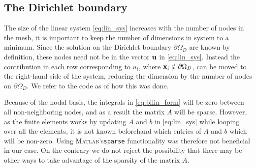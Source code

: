 \subsection{The Dirichlet boundary}
 The size of the linear system \eqref{eq:lin_sys} increases with the number of nodes in the mesh, it is important to keep the number of dimensions in system to a minimum. Since the solution on the Dirichlet boundary $\partial\Omega_D$ are known by definition, these nodes need not be in the vector $\vb{u}$ in \eqref{eq:lin_sys}. Instead the contribution in each row corresponding to $u_i$, where $\vb{x}_i \notin \partial\Omega_D$, can be moved to the right-hand side of the system, reducing the dimension by the number of nodes on $\partial\Omega_D$. We refer to the code as of how this was done.

 Because of the nodal basis, the integrals in \eqref{eq:bilin_form} will be zero between all non-neighboring nodes, and as a result the matrix $A$ will be sparse. However, as the finite elements works by updating $A$ and $b$ in \eqref{eq:lin_sys} while looping over all the elements, it is not known beforehand which entries of $A$ and $b$ which will be non-zero. Using \textsc{Matlab}'s\xspace \texttt{sparse} functionality was therefore not beneficial in our case. On the contrary we do not reject the possibility that there may be other ways to take advantage of the sparsity of the matrix $A$.